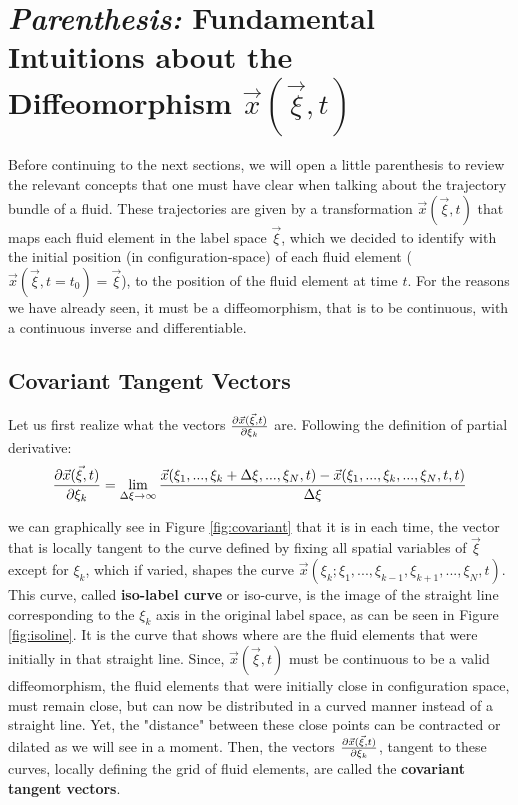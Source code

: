 \documentclass[11pt, a4paper]{article} %
\begin{document}
\newpage
\section*{{\em Parenthesis: }Fundamental Intuitions about the Diffeomorphism $\vec{x}(\vec{\xi},t)$}

Before continuing to the next sections, we will open a little parenthesis to review the relevant concepts that one must have clear when talking about the trajectory bundle of a fluid. These trajectories are given by a transformation $\vec{x}(\vec{\xi},t)$ that maps each fluid element in the label space $\vec{\xi}$, which we decided to identify with the initial position (in configuration-space) of each fluid element ($\vec{x}(\vec{\xi},t=t_0)=\vec{\xi}$), to the position of the fluid element at time $t$. For the reasons we have already seen, it must be a diffeomorphism, that is to be continuous, with a continuous inverse and differentiable. \vspace{-0.3cm}
\subsection*{ Covariant Tangent Vectors \vspace{-0.3cm}}
Let us first realize what the vectors $\pdv{\vec{x}(\vec{\xi},t)}{\xi_k}$ are. Following the definition of partial derivative:
\begin{equation}
\pdv{\vec{x}(\vec{\xi},t)}{\xi_k}=\lim_{\Delta \xi \rightarrow \infty} \frac{\vec{x}(\xi_1,...,\xi_k+\Delta \xi,...,\xi_N,t)-\vec{x}(\xi_1,...,\xi_k,...,\xi_N,t,t)}{\Delta \xi}
\end{equation}

we can graphically see in Figure \ref{fig:covariant} that it is in each time, the vector that is locally tangent to the curve defined by fixing all spatial variables of $\vec{\xi}$ except for $\xi_k$, which if varied, shapes the curve $\vec{x}(\xi_k;\xi_1,...,\xi_{k-1},\xi_{k+1},...,\xi_N,t)$. This curve, called {\bf iso-label curve} or iso-curve, is the image of the straight line corresponding to the $\xi_k$ axis in the original label space, as can be seen in Figure \ref{fig:isoline}. It is the curve that shows where are the fluid elements that were initially in that straight line. Since, $\vec{x}(\vec{\xi},t)$ must be continuous to be a valid diffeomorphism, the fluid elements that were initially close in configuration space, must remain close, but can now be distributed in a curved manner instead of a straight line. Yet, the "distance" between these close points can be contracted or dilated as we will see in a moment. Then, the vectors $\pdv{\vec{x}(\vec{\xi},t)}{\xi_k}$, tangent to these curves, locally defining the grid of fluid elements, are called the {\bf covariant tangent vectors}.
\end{document}
